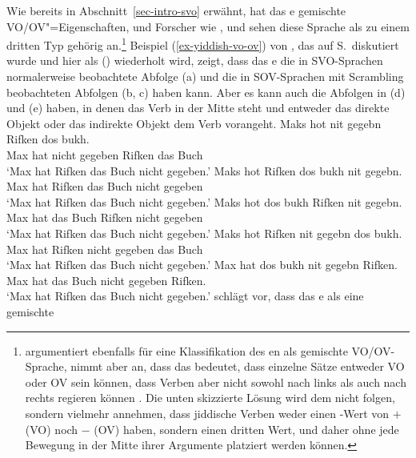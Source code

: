 Wie bereits in Abschnitt~\ref{sec-intro-svo} erwähnt, hat das e gemischte VO/OV"=Eigenschaften, und
Forscher wie \citet[]{dBMvW86a}, \citet[]{Schallert2007a} und \textcites[]{Haider2010a}{Haider2020a} sehen
diese Sprache als zu einem dritten Typ gehörig an.\footnote{
  \textcites{Santorini93a} argumentiert ebenfalls für eine Klassifikation des en als gemischte VO/OV-Sprache,
  nimmt aber an, dass das bedeutet, dass einzelne Sätze entweder VO oder OV sein können, dass Verben aber nicht
  sowohl nach links als auch nach rechts regieren können \citet[]{Santorini93a}. Die unten skizzierte Lösung
  wird dem nicht folgen, sondern vielmehr annehmen, dass jiddische Verben weder einen \initial-Wert von $+$
  (VO) noch $-$ (OV) haben, sondern einen dritten Wert, und daher ohne jede Bewegung in der Mitte ihrer Argumente
  platziert werden können.
} Beispiel (\ref{ex-yiddish-vo-ov}) von \citet[]{Diesing97a}, das auf S.\,\pageref{ex-yiddish-vo-ov} diskutiert wurde und hier
als () wiederholt wird, zeigt, dass das e die in SVO-Sprachen normalerweise beobachtete Abfolge
(a) und die in SOV-Sprachen mit Scrambling beobachteten Abfolgen (b, c) haben kann. Aber es kann auch
die Abfolgen in (d) und (e) haben, in denen das Verb in der Mitte steht und entweder das
direkte Objekt oder das indirekte Objekt dem Verb vorangeht.
\eal
\ex
\gll Maks hot nit gegebn Rifken dos bukh.\\
     Max  hat nicht gegeben  Rifken das Buch\\\yiddish
\glt `Max hat Rifken das Buch nicht gegeben.'
\ex
\gll Maks hot Rifken dos bukh nit gegebn.\\
     Max  hat Rifken das Buch nicht gegeben\\
\glt `Max hat Rifken das Buch nicht gegeben.'
\ex
\gll Maks hot dos bukh Rifken nit gegebn.\\
     Max  hat das Buch Rifken nicht gegeben\\
\glt `Max hat Rifken das Buch nicht gegeben.'
\ex
\gll Maks hot Rifken nit gegebn dos bukh.\\
     Max  hat Rifken nicht gegeben  das Buch\\
\glt `Max hat Rifken das Buch nicht gegeben.'
\ex
\glt Max hat dos bukh nit gegebn Rifken.\\
     Max hat das Buch nicht gegeben  Rifken.\\
\glt `Max hat Rifken das Buch nicht gegeben.'
\zl
\citet[]{Haider2010a} schlägt vor, dass das e als eine gemischte

